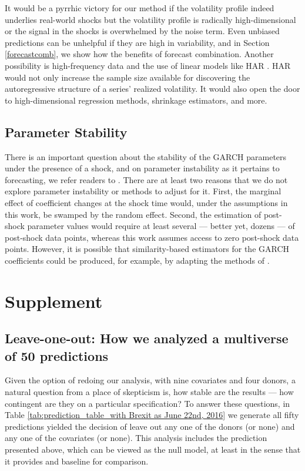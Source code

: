 \documentclass[11pt,3p,review,authoryear]{elsarticle}
\theoremstyle{definition}
\begin{document}
It would be a pyrrhic victory for our method if the volatility profile indeed underlies real-world shocks but the volatility profile is radically high-dimensional or the signal in the shocks is overwhelmed by the noise term.  Even unbiased predictions can be unhelpful if they are high in variability, and in Section \ref{forecastcomb}, we show how the benefits of forecast combination.  Another possibility is high-frequency data and the use of linear models like HAR \citep{corsi2012har}.  HAR would not only increase the sample size available for discovering the autoregressive structure of a series' realized volatility.  It would also open the door to high-dimensional regression methods, shrinkage estimators, and more.

\subsection{Parameter Stability}

There is an important question about the stability of the GARCH parameters under the presence of a shock, and on parameter instability as it pertains to forecasting, we refer readers to \cite{rossi2013advances, rossi2021forecasting}.  There are at least two reasons that we do not explore parameter instability or methods to adjust for it.  First, the marginal effect of coefficient changes at the shock time would, under the assumptions in this work, be swamped by the random effect.  Second, the estimation of post-shock parameter values would require at least several --- better yet, dozens --- of post-shock data points, whereas this work assumes access to zero post-shock data points.  However, it is possible that similarity-based estimators for the GARCH coefficients could be produced, for example, by adapting the methods of \citet{dendramis2020similarity}.

\section{Supplement}

\subsection{Leave-one-out: How we analyzed a multiverse of 50 predictions}

Given the option of redoing our analysis, with nine covariates and four donors, a natural question from a place of skepticism is, how stable are the results --- how contingent are they on a particular specification?  To answer these questions, in Table \ref{tab:prediction_table_with Brexit as June 22nd, 2016} we generate all fifty predictions yielded the decision of leave out any one of the donors (or none) and any one of the covariates (or none).  This analysis includes the prediction presented above, which can be viewed as the null model, at least in the sense that it provides and baseline for comparison.
\end{document}
